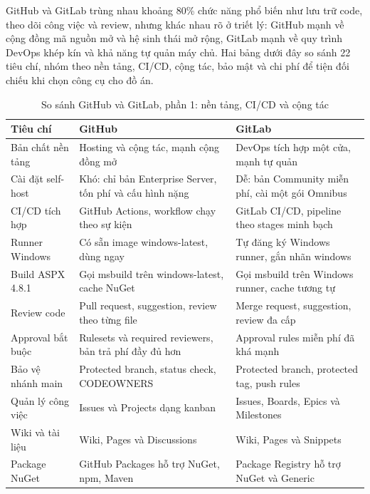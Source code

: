 GitHub và GitLab trùng nhau khoảng 80\% chức năng phổ biến như lưu trữ code,
theo dõi công việc và review, nhưng khác nhau rõ ở triết lý:
GitHub mạnh về cộng đồng mã nguồn mở và hệ sinh thái mở rộng,
GitLab mạnh về quy trình DevOps khép kín và khả năng tự quản máy chủ.
Hai bảng dưới đây so sánh 22 tiêu chí, nhóm theo nền tảng, CI/CD,
cộng tác, bảo mật và chi phí để tiện đối chiếu khi chọn công cụ cho đồ án.

\begin{table}[H]
\centering
\caption{So sánh GitHub và GitLab, phần 1: nền tảng, CI/CD và cộng tác}
\label{tab:c6-gh-gl-1}
\begin{tabular}{p{3.2cm}p{5.4cm}p{5.4cm}}
\toprule
Tiêu chí & GitHub & GitLab \\
\midrule
Bản chất nền tảng & Hosting và cộng tác, mạnh cộng đồng mở \cite{githubdocs} & DevOps tích hợp một cửa, mạnh tự quản \cite{gitlabdocs} \\
Cài đặt self-host & Khó: chỉ bản Enterprise Server, tốn phí và cấu hình nặng & Dễ: bản Community miễn phí, cài một gói Omnibus \\
CI/CD tích hợp & GitHub Actions, workflow chạy theo sự kiện \cite{ghactions} & GitLab CI/CD, pipeline theo stages minh bạch \cite{gitlabci} \\
Runner Windows & Có sẵn image windows-latest, dùng ngay & Tự đăng ký Windows runner, gắn nhãn windows \\
Build ASPX 4.8.1 & Gọi msbuild trên windows-latest, cache NuGet \cite{msmsbuild} & Gọi msbuild trên Windows runner, cache tương tự \\
Review code & Pull request, suggestion, review theo từng file & Merge request, suggestion, review đa cấp \\
Approval bắt buộc & Rulesets và required reviewers, bản trả phí đầy đủ hơn & Approval rules miễn phí đã khá mạnh \\
Bảo vệ nhánh main & Protected branch, status check, CODEOWNERS & Protected branch, protected tag, push rules \\
Quản lý công việc & Issues và Projects dạng kanban & Issues, Boards, Epics và Milestones \\
Wiki và tài liệu & Wiki, Pages và Discussions & Wiki, Pages và Snippets \\
Package NuGet & GitHub Packages hỗ trợ NuGet, npm, Maven & Package Registry hỗ trợ NuGet và Generic \\
\bottomrule
\end{tabular}
\end{table}

